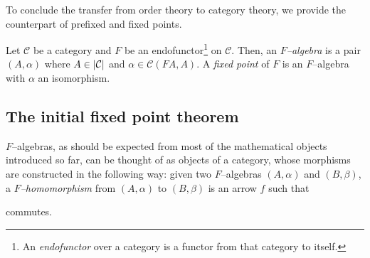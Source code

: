 To conclude the transfer from order theory to category theory, we provide the counterpart of prefixed and fixed points.

\begin{dfn}
  Let \(\mathcal{C}\) be a category and \(F\) be an endofunctor\footnote{An \emph{endofunctor} over a category is a functor from that category to itself.} on \(\mathcal{C}\).
  Then, an \emph{\(F\)--algebra} is a pair \((A,\alpha)\) where \(A \in \lvert \mathcal{C} \rvert\) and \(\alpha \in \mathcal{C}(FA,A)\).
  A \emph{fixed point} of \(F\) is an \(F\)--algebra with \(\alpha\) an isomorphism.%
\end{dfn}

\subsection{The initial fixed point theorem}

\(F\)--algebras, as should be expected from most of the mathematical objects introduced so far, can be thought of as objects of a category, whose morphisms are constructed in the following way: given two \(F\)--algebras \((A,\alpha)\) and \((B,\beta)\), a \emph{\(F\)--homomorphism} from \((A,\alpha)\) to \((B,\beta)\) is an arrow \(f\) such that
\begin{center}
\end{center}
commutes.


